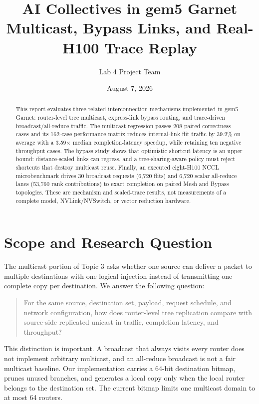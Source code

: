 \documentclass[10pt]{article}
\title{AI Collectives in gem5 Garnet\\
\large Multicast, Bypass Links, and Real-H100 Trace Replay}
\author{Lab 4 Project Team}
\date{August 7, 2026}
\begin{document}
\maketitle

\begin{abstract}
This report evaluates three related interconnection mechanisms implemented in
gem5 Garnet: router-level tree multicast, express-link bypass routing, and
trace-driven broadcast/all-reduce traffic.  The multicast regression passes
208 paired correctness cases and its 162-case performance matrix reduces
internal-link flit traffic by 39.2\% on average with a 3.59$\times$ median
completion-latency speedup, while retaining ten negative throughput cases.
The bypass study shows that optimistic shortcut latency is an upper bound:
distance-scaled links can regress, and a tree-sharing-aware policy must reject
shortcuts that destroy multicast reuse.  Finally, an executed eight-H100 NCCL
microbenchmark drives 30 broadcast requests (6,720 flits) and 6,720 scalar
all-reduce lanes (53,760 rank contributions) to exact completion on paired
Mesh and Bypass topologies.  These are mechanism and scaled-trace results, not
measurements of a complete model, NVLink/NVSwitch, or vector reduction
hardware.
\end{abstract}

\section{Scope and Research Question}

The multicast portion of Topic 3 asks whether one source can deliver a packet
to multiple destinations with one logical injection instead of transmitting
one complete copy per destination.  We answer the following question:

\begin{quote}
For the same source, destination set, payload, request schedule, and network
configuration, how does router-level tree replication compare with source-side
replicated unicast in traffic, completion latency, and throughput?
\end{quote}

This distinction is important.  A broadcast that always visits every router
does not implement arbitrary multicast, and an all-reduce broadcast is not a
fair multicast baseline.  Our implementation carries a 64-bit destination
bitmap, prunes unused branches, and generates a local copy only when the local
router belongs to the destination set.  The current bitmap limits one
multicast domain to at most 64 routers.
\end{document}
